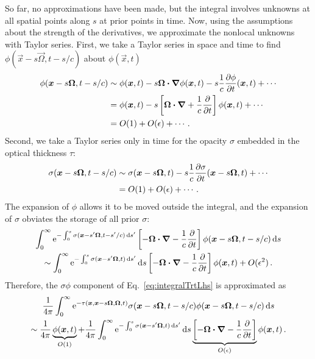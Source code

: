 \documentclass[11pt,letter,twoside]{mc2011}
\newcommand{\epsiloncolor}[1]{#1}
\begin{document}
So far, no approximations have been made, but the integral involves unknowns at
all spatial points along $s$ at prior points in time. Now, using the
assumptions about the strength of the derivatives, we approximate the
nonlocal unknowns with Taylor series. First, we take a Taylor series in space
and time to find $\phi(\vec{x} - s \vec{\Omega}, t-s/c)$ about $ \phi(\vec{x},
t)$
\begin{align*}
  \phi(\vec{x} - s \vec{\Omega}, t-s/c)
  &\sim
  \phi(\vec{x}, t) - s \vec{\Omega} \vd \del \phi(\vec{x}, t)
  - s\frac{1}{c} \pder{\phi}{t}(\vec{x}, t) + \cdots
  \\
  &= \phi(\vec{x}, t) - s \left[ \vec{\Omega} \vd \del
  + \frac{1}{c} \pder{}{t} \right] \phi(\vec{x}, t) + \cdots
  \\
  &= O(\epsiloncolor{1}) +
  O(\epsiloncolor{\epsilon}) + \cdots\,.
\end{align*}
Second, we take a Taylor series only in time for the opacity $\sigma$ embedded
in the optical thickness $\tau$:
\begin{align*}
  \sigma(\vec{x} - s \vec{\Omega}, t-s/c)
  &\sim
  \sigma(\vec{x} - s \vec{\Omega}, t)
  - s\frac{1}{c} \pder{\sigma}{t}(\vec{x} - s \vec{\Omega}, t) + \cdots
  \\
  &= O(\epsiloncolor{1}) + O(\epsiloncolor{\epsilon}) + \cdots\,.
\end{align*}
The expansion of $\phi$ allows it to be moved outside the integral, and the
expansion of $\sigma$ obviates the storage of all prior $\sigma$:
\begin{multline*}
  \int_{0}^{\infty} \mathop{}\!\mathrm{e}^{- \int_{0}^{s} \sigma(\bm{x}-s'\bm{\Omega}, t-s'/c) \mathop{}\!\mathrm{d} s'}
\left[ -\bm{\Omega} \bm{\cdot} \bm{\nabla} - \frac1c \frac{\partial }{\partial t} \right] \phi(\bm{x} - s \bm{\Omega}, t-s/c)
\mathop{}\!\mathrm{d} s
\\
\sim \int_{0}^{\infty} \mathop{}\!\mathrm{e}^{- \int_{0}^{s} \sigma(\bm{x}-s'\bm{\Omega}, t)
\mathop{}\!\mathrm{d} s'} \mathop{}\!\mathrm{d} s
\left[ -\bm{\Omega} \bm{\cdot} \bm{\nabla} - \frac1c \frac{\partial }{\partial t} \right] \phi(\bm{x}, t)
+ O(\epsilon^2) \,.
\end{multline*}
Therefore, the $\sigma\phi$ component of Eq.~\eqref{eq:integralTrtLhs} is
approximated as
\begin{multline}\label{eq:term1Approx}
  \frac{1}{4\pi}\int_{0}^{\infty} \mathop{}\!\mathrm{e}^{ -\tau(\bm{x}, \bm{x} - s
  \bm{\Omega}, \bm{\Omega}, t)} \sigma(\bm{x} - s \bm{\Omega}, t-s/c)
  \phi(\bm{x} - s \bm{\Omega}, t-s/c) \mathop{}\!\mathrm{d} s
  \\
  \sim 
  \frac{1}{4\pi}\underbrace{\phi(\bm{x}, t)}_{O(1)}
  + \frac{1}{4\pi}\int_{0}^{\infty} \mathop{}\!\mathrm{e}^{- \int_{0}^{s} \sigma(\bm{x}-s'\bm{\Omega}, t)
\mathop{}\!\mathrm{d} s'} \mathop{}\!\mathrm{d} s
\underbrace{\left[ -\bm{\Omega} \bm{\cdot} \bm{\nabla} - \frac1c \frac{\partial }{\partial t} \right]}_{O(\epsilon)} \phi(\bm{x}, t)\,.
\end{multline}
\end{document}
